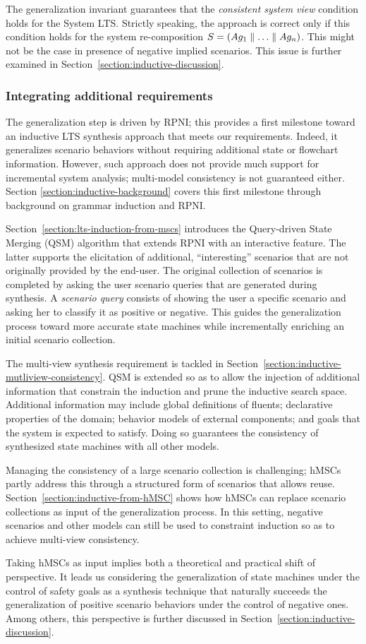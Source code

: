 The generalization invariant guarantees that the \emph{consistent system view} condition holds for the System LTS. Strictly speaking, the approach is correct only if this condition holds for the system re-composition $S = (Ag_1 \parallel \ldots \parallel Ag_n)$. This might not be the case in presence of negative implied scenarios. This issue is further examined in Section~\ref{section:inductive-discussion}.

\subsubsection*{Integrating additional requirements}

The generalization step is driven by RPNI; this provides a first milestone toward an inductive LTS synthesis approach that meets our requirements. Indeed, it generalizes scenario behaviors without requiring additional state or flowchart information. However, such approach does not provide much support for incremental system analysis; multi-model consistency is not guaranteed either. Section \ref{section:inductive-background} covers this first milestone through background on grammar induction and RPNI.

Section~\ref{section:lts-induction-from-mscs} introduces the Query-driven State Merging (QSM) algorithm that extends RPNI with an interactive feature. The latter supports the elicitation of additional, ``interesting'' scenarios that are not originally provided by the end-user. The original collection of scenarios is completed by asking the user scenario queries that are generated during synthesis. A \emph{scenario query} consists of showing the user a specific scenario and asking her to classify it as positive or negative. This guides the generalization process toward more accurate state machines while incrementally enriching an initial scenario collection.

The multi-view synthesis requirement is tackled in Section~\ref{section:inductive-mutliview-consistency}. QSM is extended so as to allow the injection of additional information that constrain the induction and prune the inductive search space. Additional information may include global definitions of fluents; declarative properties of the domain; behavior models of external components; and goals that the system is expected to satisfy. Doing so guarantees the consistency of synthesized state machines with all other models.

Managing the consistency of a large scenario collection is challenging; hMSCs partly address this through a structured form of scenarios that allows reuse. Section~\ref{section:inductive-from-hMSC} shows how hMSCs can replace scenario collections as input of the generalization process. In this setting, negative scenarios and other models can still be used to constraint induction so as to achieve multi-view consistency. 

Taking hMSCs as input implies both a theoretical and practical shift of perspective. It leads us considering the generalization of state machines under the control of safety goals as a synthesis technique that naturally succeeds the generalization of positive scenario behaviors under the control of negative ones. Among others, this perspective is further discussed in Section~\ref{section:inductive-discussion}.

